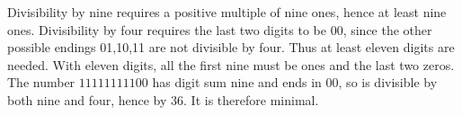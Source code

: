 Divisibility by nine requires a positive multiple of nine ones, hence at least nine ones. Divisibility by four requires the last two digits to be 00, since the other possible endings 01,10,11 are not divisible by four. Thus at least eleven digits are needed. With eleven digits, all the first nine must be ones and the last two zeros. The number $\boxed{11111111100}$ has digit sum nine and ends in 00, so is divisible by both nine and four, hence by 36. It is therefore minimal.
